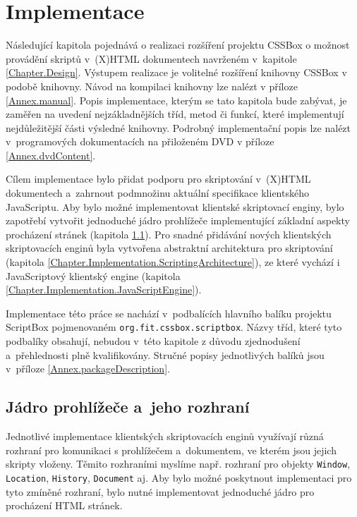 \chapter{Implementace}
\label{Chapter.Implementation}

Následující kapitola pojednává o realizaci rozšíření projektu CSSBox o možnost provádění skriptů v~(X)HTML dokumentech navrženém v~kapitole \ref{Chapter.Design}. Výstupem realizace je volitelné rozšíření knihovny CSSBox v podobě knihovny. Návod na kompilaci knihovny lze nalézt v příloze \ref{Annex.manual}. Popis implementace, kterým se tato kapitola bude zabývat, je zaměřen na uvedení nejzákladnějších tříd, metod či funkcí, které implementují nejdůležitější části výsledné knihovny. Podrobný implementační popis lze nalézt v~programových dokumentacích na přiloženém DVD v příloze \ref{Annex.dvdContent}.

Cílem implementace bylo přidat podporu pro skriptování v~(X)HTML dokumentech a~zahrnout podmnožinu aktuální specifikace klientského JavaScriptu. Aby bylo možné implementovat klientské skriptovací enginy, bylo zapotřebí vytvořit jednoduché jádro prohlížeče implementující základní aspekty procházení stránek (kapitola \ref{Chapter.Implementation.BrowsingCore}). Pro snadné přidávání nových klientských skriptovacích enginů byla vytvořena abstraktní architektura pro skriptování (kapitola \ref{Chapter.Implementation.ScriptingArchitecture}), ze které vychází i JavaScriptový klientský engine (kapitola \ref{Chapter.Implementation.JavaScriptEngine}).

Implementace této práce se nachází v~podbalících hlavního balíku projektu ScriptBox pojmenovaném \texttt{org.fit.cssbox.scriptbox}.  Názvy tříd, které tyto podbalíky obsahují, nebudou v~této kapitole z důvodu zjednodušení a~přehlednosti plně kvalifikovány. Stručné popisy jednotlivých balíků jsou v~příloze \ref{Annex.packageDescription}.

\vspace{-0.5em}

\section{Jádro prohlížeče a~jeho rozhraní}
\label{Chapter.Implementation.BrowsingCore}

Jednotlivé implementace klientských skriptovacích enginů využívají různá rozhraní pro komunikaci s prohlížečem a~dokumentem, ve kterém jsou jejich skripty vloženy. Těmito rozhraními myslíme např. rozhraní pro objekty \texttt{Window}, \texttt{Location}, \texttt{History}, \texttt{Document} aj. Aby bylo možné poskytnout implementaci pro tyto zmíněné rozhraní, bylo nutné implementovat jednoduché jádro pro procházení HTML stránek.

